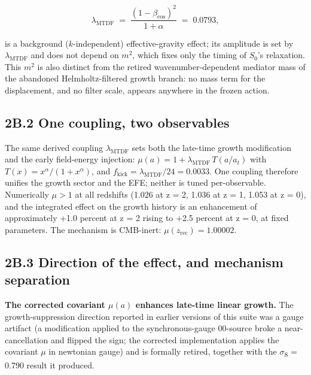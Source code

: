 \documentclass[11pt,a4paper]{article}
\begin{document}
\[
\lambda_{\mathrm{MTDF}} \;=\; \frac{(1-\beta_{\mathrm{eos}})^2}{1+\alpha} \;=\; 0.0793,
\]

is a background (\(k\)-independent) effective-gravity effect; its amplitude is set by \(\lambda_{\mathrm{MTDF}}\) and does not depend on \(m^2\), which fixes only the timing of \(S_0\)'s relaxation. This \(m^2\) is also distinct from the retired wavenumber-dependent mediator mass of the abandoned Helmholtz-filtered growth branch: no mass term for the displacement, and no filter scale, appears anywhere in the frozen action.

\subsection*{2B.2 One coupling, two observables}
The same derived coupling \(\lambda_{\mathrm{MTDF}}\) sets both the late-time growth modification and the early field-energy injection: \(\mu(a) = 1 + \lambda_{\mathrm{MTDF}}\,T(a/a_t)\) with \(T(x) = x^\alpha/(1+x^\alpha)\), and \(f_{\mathrm{kick}} = \lambda_{\mathrm{MTDF}}/24 = 0.0033\). One coupling therefore unifies the growth sector and the EFE; neither is tuned per-observable. Numerically \(\mu > 1\) at all redshifts (1.026 at z = 2, 1.036 at z = 1, 1.053 at z = 0), and the integrated effect on the growth history is an enhancement of approximately +1.0 percent at z = 2 rising to +2.5 percent at z = 0, at fixed parameters. The mechanism is CMB-inert: \(\mu(z_{\mathrm{rec}}) = 1.00002\).

\subsection*{2B.3 Direction of the effect, and mechanism separation}
\textbf{The corrected covariant \(\mu(a)\) enhances late-time linear growth.} The growth-suppression direction reported in earlier versions of this suite was a gauge artifact (a modification applied to the synchronous-gauge 00-source broke a near-cancellation and flipped the sign; the corrected implementation applies the covariant \(\mu\) in newtonian gauge) and is formally retired, together with the $\sigma$\textsubscript{8} = 0.790 result it produced.
\end{document}
